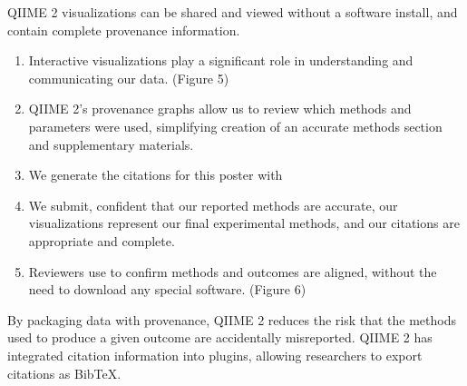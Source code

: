 \documentclass[final]{beamer}
\newlength{\colwidth}
\begin{document}
\begin{frame}[t]
\begin{columns}[t]
\begin{column}{\colwidth}
\begin{block}{QIIME 2 visualizations can be shared and viewed without a software install, and contain complete provenance information.}
    \begin{enumerate}
      \item Interactive visualizations play a significant role in understanding and
      communicating our data.  (Figure 5)
      \item QIIME 2’s provenance graphs allow us to review which methods and
      parameters were used, simplifying creation of an accurate methods section
      and supplementary materials.
      \item We generate the citations for this poster with 
      \item We submit, confident that our reported methods are accurate, our
      visualizations represent our final experimental methods, and our
      citations are appropriate and complete.
      \item Reviewers use  to confirm methods and outcomes are
      aligned, without the need to download any special software. (Figure 6)
    \end{enumerate}

    \begin{tcolorbox}
    [width=\textwidth, colframe=blue]
    {By packaging data with provenance, QIIME 2 reduces the risk that the
    methods used to produce a given outcome are accidentally misreported.
    QIIME 2 has integrated citation information into plugins, allowing
    researchers to export citations as BibTeX}.
    \end{tcolorbox}



\end{block}
\end{column}
\end{columns}
\end{frame}
\end{document}
